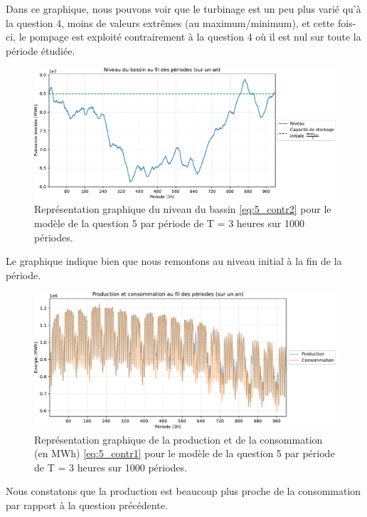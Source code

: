 \documentclass{article}
\begin{document}
\noindent Dans ce graphique, nous pouvons voir que le turbinage est un peu plus varié qu'à la question 4, moins de valeurs extrêmes (au maximum/minimum), et cette fois-ci,
le pompage est exploité contrairement à la question 4 où il est nul sur toute la période étudiée.

\begin{figure}[H]
    \centering
    \includegraphics[scale=0.6]{GraphesP2/Niveau_Bassin_Q5.pdf}
    \caption{Représentation graphique du niveau du bassin \eqref{eq:5_contr2} pour le modèle 
    de la question 5 par période de T = 3 heures sur 1000 périodes.}
    \label{fig:Niveau_bassin_Q5}
\end{figure}

\noindent Le graphique indique bien que nous remontons au niveau initial à la fin de la période. 

\begin{figure}[H]
    \centering
    \includegraphics[scale=0.6]{GraphesP2/Prod_Cons_Q5.pdf}
    \caption{Représentation graphique de la production et de la consommation (en MWh) 
    \eqref{eq:5_contr1} pour le modèle de la question 5 par période de T = 3 heures sur 1000 périodes.}
    \label{fig:Prod_Cons_Q5}
\end{figure}
\noindent Nous constatons que la production est beaucoup plus proche de la consommation par rapport à la question précédente.
\end{document}
